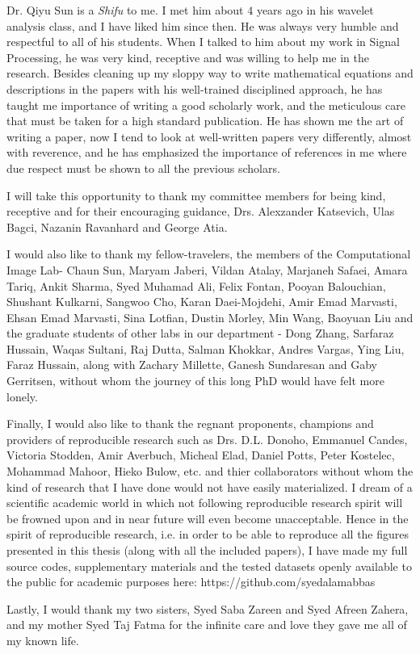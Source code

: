 \documentclass{UCF_ETD}
\begin{document}
\begin{acknowledgments}
Dr. Qiyu Sun is a \emph{Shifu} to me. I met him about $4$ years ago in his wavelet analysis class, and I have liked him since then. He was always very humble and respectful to all of his students. When I talked to him about my work in Signal Processing, he was very kind, receptive and was willing to help me in the research. Besides cleaning up my sloppy way to write mathematical equations and descriptions in the papers with his well-trained disciplined approach, he has taught me importance of writing a good scholarly work, and the meticulous care that must be taken for a high standard publication. He has shown me the art of writing a paper, now I tend to look at well-written papers very differently, almost with reverence, and he has emphasized the importance of references in me where due respect must be shown to all the previous scholars. 

I will take this opportunity to thank my committee members for being kind, receptive and for their encouraging guidance, Drs. Alexzander Katsevich, Ulas Bagci, Nazanin Ravanhard and George Atia. 

I would also like to thank my fellow-travelers, the members of the Computational Image Lab- Chaun Sun, Maryam Jaberi, Vildan Atalay, Marjaneh Safaei, Amara Tariq, Ankit Sharma, Syed Muhamad Ali, Felix Fontan, Pooyan Balouchian, Shushant Kulkarni, Sangwoo Cho, Karan Daei-Mojdehi, Amir Emad Marvasti, Ehsan Emad Marvasti, Sina Lotfian, Dustin Morley, Min Wang, Baoyuan Liu and the graduate students of other labs in our department - Dong Zhang, Sarfaraz Hussain, Waqas Sultani, Raj Dutta, Salman Khokkar, Andres Vargas, Ying Liu, Faraz Hussain, along with Zachary Millette, Ganesh Sundaresan and Gaby Gerritsen, without whom the journey of this long PhD would have felt more lonely. 

Finally, I would also like to thank the regnant proponents, champions and providers of reproducible research such as Drs. D.L. Donoho, Emmanuel Candes, Victoria Stodden, Amir Averbuch, Micheal Elad, Daniel Potts, Peter Kostelec, Mohammad Mahoor, Hieko Bulow, etc. and thier collaborators without whom the kind of research that I have done would not have easily materialized. I dream of a scientific academic world in which not following reproducible research spirit will be frowned upon and in near future will even become unacceptable. Hence in the spirit of reproducible research, i.e. in order to be able to reproduce all the figures presented in this thesis (along with all the included papers), I have made my full source codes, supplementary materials and the tested datasets openly available to the public for academic purposes here: https://github.com/syedalamabbas

Lastly, I would thank my two sisters, Syed Saba Zareen and Syed Afreen Zahera, and my mother Syed Taj Fatma for the infinite care and love they gave me all of my known life. 

\end{acknowledgments}
\end{document}
